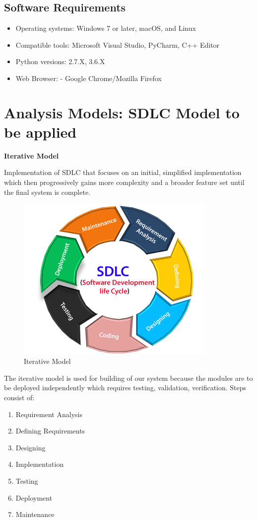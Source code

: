 \subsection{Software Requirements}
\begin{itemize}
    \item Operating systems: Windows 7 or later, macOS, and Linux 
    \item Compatible tools: Microsoft Visual Studio, PyCharm, C++ Editor    
    \item Python versions: 2.7.X, 3.6.X 
    \item Web Browser: - Google Chrome/Mozilla Firefox
\end{itemize}

\newpage
\section{Analysis Models: SDLC Model to be applied}
{\normalsize{\textbf{Iterative Model}}} 
{\normalsize{\par Implementation of SDLC that focuses on an initial, simplified implementation which then progressively gains more complexity and a broader feature set until the final system is complete.}}

\vspace*{0.2cm}
\begin{figure}[h]
  \begin{center}
  \includegraphics[height=80mm]{Images/Figures/software-engineering-software-development-life-cycle.jpeg}
  \caption{Iterative Model}
  \end{center}
\end{figure}

\vspace*{0.2cm}
\newpage
{\normalsize{The iterative model is used for building of our system because the modules are to be deployed independently which requires testing, validation, verification. Steps consist of: }}
\begin{enumerate} 
    \item Requirement Analysis
    \item Defining Requirements
    \item Designing
    \item Implementation 
    \item Testing
    \item Deployment
    \item Maintenance
\end{enumerate}

